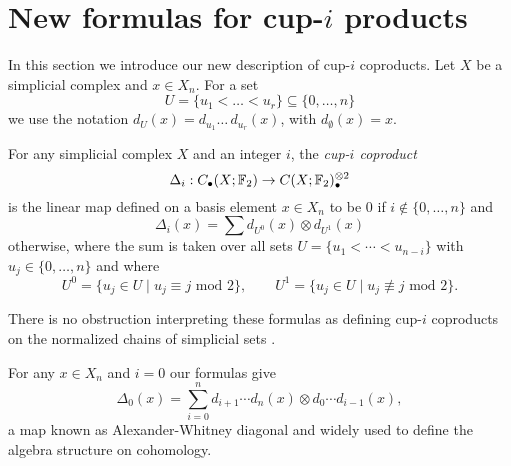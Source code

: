 
\section{New formulas for cup-$i$ products} \label{s:formulas}

In this section we introduce our new description of cup-$i$ coproducts.
Let $X$ be a simplicial complex and $x \in X_n$.
For a set
\begin{equation*}
U = \{u_1 < \dots < u_r\} \subseteq \{0, \dots, n\}
\end{equation*}
we use the notation $d_U(x) = d_{u_1} \ldots\, d_{u_r}(x)$, with $d_{\emptyset}(x) = x$.

\begin{definition} \label{d:cup-i coproducts}	
	For any simplicial complex $X$ and an integer $i$, the \textit{cup-$i$ coproduct}
	\begin{equation*}
	\Delta_i : C_\bullet(X; \mathbb{F}_2) \to C(X; \mathbb{F}_2)^{\otimes 2}_\bullet
	\end{equation*}
	is the linear map defined on a basis element $x \in X_n$ to be $0$ if $i \not\in \{0, \dots, n\}$ and
	\begin{equation} \label{equation: simplicial cup-i coproducts}
	\Delta_i(x) = \sum d_{U^0}(x) \otimes d_{U^1}(x)
	\end{equation}
	otherwise, where the sum is taken over all sets $U = \{u_1 < \cdots < u_{n-i}\}$ with $u_j \in \{0, \dots, n\}$ and where
	\begin{equation*}
	U^0 = \{u_j \in U\mid u_j \equiv j \text{ mod } 2\}, \qquad
	U^1 = \{u_j \in U\mid u_j \not\equiv j \text{ mod } 2\}.
	\end{equation*}
\end{definition}

\begin{remark}
	There is no obstruction interpreting these formulas as defining cup-$i$ coproducts on the normalized chains of simplicial sets \cite{friedman2012simplicial}.
\end{remark}

\begin{example}
	For any $x \in X_n$ and $i = 0$ our formulas give
	\begin{equation*}
	\Delta_0(x) = \sum_{i=0}^n d_{i+1} \cdots d_{n}(x) \otimes d_{0} \cdots d_{i-1}(x),
	\end{equation*}
	a map known as Alexander-Whitney diagonal and widely used to define the algebra structure on cohomology.
\end{example}

